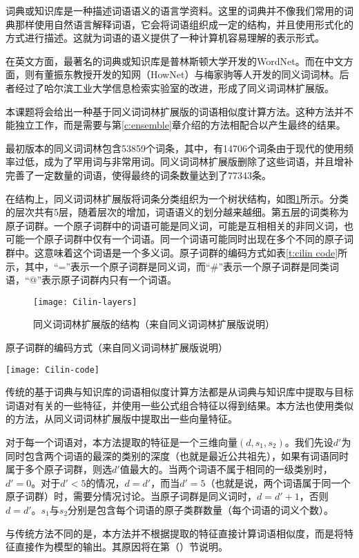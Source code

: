 
\label{c:dict lib}
词典或知识库是一种描述词语语义的语言学资料。这里的词典并不像我们常用的词典那样使用自然语言解释词语，它会将词语组织成一定的结构，并且使用形式化的方式进行描述。这就为词语的语义提供了一种计算机容易理解的表示形式。

在英文方面，最著名的词典或知识库是普林斯顿大学开发的WordNet。而在中文方面，则有董振东教授开发的知网（HowNet）与梅家驹等人开发的同义词词林。后者经过了哈尔滨工业大学信息检索实验室的改进，形成了同义词词林扩展版。

本课题将会给出一种基于同义词词林扩展版的词语相似度计算方法。这种方法并不能独立工作，而是需要与第\ref{c:ensemble}章介绍的方法相配合以产生最终的结果。

最初版本的同义词词林包含53859个词条，其中，有14706个词条由于现代的使用频率过低，成为了罕用词与非常用词。同义词词林扩展版删除了这些词语，并且增补完善了一定数量的词语，使得最终的词条数量达到了77343条。

在结构上，同义词词林扩展版将词条分类组织为一个树状结构，如图\ref{f:cilin layers}所示。分类的层次共有5层，随着层次的增加，词语语义的划分越来越细。第五层的词类称为原子词群。一个原子词群中的词语可能是同义词，可能是互相相关的非同义词，也可能一个原子词群中仅有一个词语。同一个词语可能同时出现在多个不同的原子词群中。这意味着这个词语是一个多义词。原子词群的编码方式如表\ref{t:cilin code}所示，其中，“=”表示一个原子词群是同义词，而“\#”表示一个原子词群是同类词语，“@”表示原子词群内只有一个词语。

\begin{figure}[h]
	\centering
	\texttt{[image: Cilin-layers]}
	\caption{同义词词林扩展版的结构（来自同义词词林扩展版说明）}
	\label{f:cilin layers}
	\vspace{-1em}
\end{figure}

\begin{table}[h]
	\caption{原子词群的编码方式（来自同义词词林扩展版说明）}
	\label{t:cilin code}
	\vspace{0.5em}
	\centering
	\texttt{[image: Cilin-code]}
\end{table}

传统的基于词典与知识库的词语相似度计算方法都是从词典与知识库中提取与目标词语对有关的一些特征，并使用一些公式组合特征以得到结果。本方法也使用类似的方法，从同义词词林扩展版中提取出一些向量特征。

对于每一个词语对，本方法提取的特征是一个三维向量$(d, s_1, s_2)$。我们先设$d'$为同时包含两个词语的最深的类别的深度（也就是最近公共祖先），如果有词语同时属于多个原子词群，则选$d'$值最大的。当两个词语不属于相同的一级类别时，$d' = 0$。对于$d' < 5$的情况，$d = d'$，而当$d' = 5$（也就是说，两个词语属于同一个原子词群）时，需要分情况讨论。当原子词群是同义词时，$d = d' + 1$，否则$d = d'$。$s_1$与$s_2$分别是包含每个词语的原子类群数量（每个词语的词义个数）。

与传统方法不同的是，本方法并不根据提取的特征直接计算词语相似度，而是将特征直接作为模型的输出。其原因将在第（）节说明。